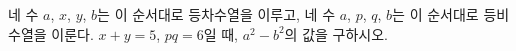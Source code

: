 네 수 $a$, $x$, $y$, $b$는 이 순서대로 등차수열을 이루고, 네 수 $a$, $p$, $q$, $b$는 이 순서대로 등비수열을 이룬다. $x+y=5$, $pq=6$일 때, $a^2-b^2$의 값을 구하시오. 
